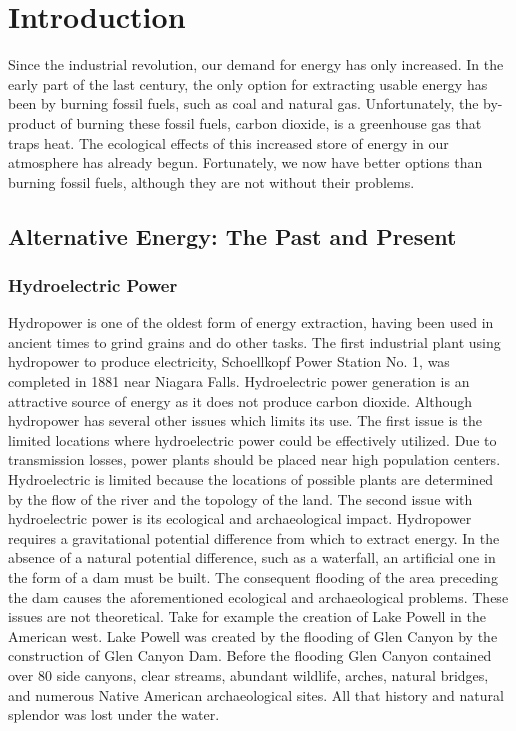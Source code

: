 \chapter{Introduction}\label{chap:intro}

Since the industrial revolution, our demand for energy has only increased.
In the early part of the last century, the only option for extracting usable energy has been by burning fossil fuels, such as coal and natural gas. Unfortunately, the by-product of burning these fossil fuels, carbon dioxide, is a greenhouse gas that traps heat. The ecological effects of this increased store of energy in our atmosphere has already begun. 
Fortunately, we now have better options than burning fossil fuels, although they are not without their problems.

\section{Alternative Energy: The Past and Present}
\subsection{Hydroelectric Power}
Hydropower is one of the oldest form of energy extraction, having been used in ancient times to grind grains and do other tasks. The first industrial plant using hydropower to produce electricity, Schoellkopf Power Station No. 1, was completed in 1881 near Niagara Falls\cite{schoellkopf}. Hydroelectric power generation is an attractive source of energy as it does not produce carbon dioxide. Although hydropower has several other issues which limits its use. The first issue is the limited locations where hydroelectric power could be effectively utilized. Due to transmission losses, power plants should be placed near high population centers. Hydroelectric is limited because the locations of possible plants are determined by the flow of the river and the topology of the land. The second issue with hydroelectric power is its ecological and archaeological impact. Hydropower requires a gravitational potential difference from which to extract energy. In the absence of a natural potential difference, such as a waterfall, an artificial one in the form of a dam must be built. The consequent flooding of the area preceding the dam causes the aforementioned ecological and archaeological problems. These issues are not theoretical. Take for example the creation of Lake Powell in the American west. Lake Powell was created by the flooding of Glen Canyon by the construction of Glen Canyon Dam. Before the flooding Glen Canyon contained over 80 side canyons, clear streams, abundant wildlife, arches, natural bridges, and numerous Native American archaeological sites. All that history and natural splendor was lost under the water.


